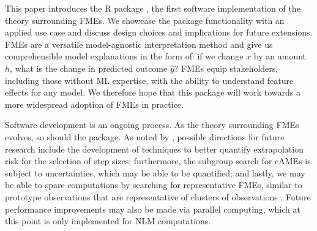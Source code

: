 This paper introduces the R package , the first software implementation of the theory surrounding FMEs. We showcase the package functionality with an applied use case and discuss design choices and implications for future extensions. FMEs are a versatile model-agnostic interpretation method and give us comprehensible model explanations in the form of: if we change $x$ by an amount $h$, what is the change in predicted outcome $\widehat{y}$? FMEs equip stakeholders, including those without ML expertise, with the ability to understand feature effects for any model. We therefore hope that this package will work towards a more widespread adoption of FMEs in practice.
\par
Software development is an ongoing process. As the theory surrounding FMEs evolves, so should the  package. As noted by \citet{scholbeck_fme}, possible directions for future research include the development of techniques to better quantify extrapolation risk for the selection of step sizes; furthermore, the subgroup search for cAMEs is subject to uncertainties, which may be able to be quantified; and lastly, we may be able to spare computations by searching for representative FMEs, similar to prototype observations that are representative of clusters of observations \citep{tan_data_mining}. Future performance improvements may also be made via parallel computing, which at this point is only implemented for NLM computations.

\newpage


\newpage
\address{Holger Löwe\\
  Ludwig-Maximilians-Universität in Munich\\
  Germany \\
  }

\address{Christian A. Scholbeck\\
  Ludwig-Maximilians-Universität in Munich\\
  Munich Center for Machine Learning (MCML)\\
  Germany \\
  \url{https://orcid.org/0000-0001-6607-4895}\\
  }

\address{Christian Heumann\\
  Ludwig-Maximilians-Universität in Munich\\
  Germany \\
  }

